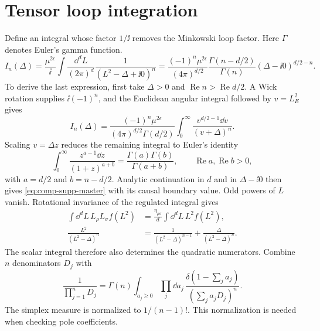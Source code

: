 \section{Tensor loop integration}
Define an integral whose factor $1/\ii$ removes the Minkowski loop
factor. Here $\Gamma$ denotes Euler's gamma function.
\begin{equation}
 I_n(\Delta)=\frac{\mu^{2\epsilon}}{\ii}
 \int\frac{\dd^dL}{(2\pi)^d}\frac1{(L^2-\Delta+\ii0)^n}
 =\frac{(-1)^n\mu^{2\epsilon}}{(4\pi)^{d/2}}
 \frac{\Gamma(n-d/2)}{\Gamma(n)}(\Delta-\ii0)^{d/2-n}.
 \label{eq:comp-supp-master}
\end{equation}
To derive the last expression, first take $\Delta>0$ and
$\operatorname{Re}n>\operatorname{Re}d/2$. A Wick rotation supplies
$\ii(-1)^n$, and the Euclidean angular integral followed by
$v=L_E^2$ gives
\begin{equation}
 I_n(\Delta)=\frac{(-1)^n\mu^{2\epsilon}}
 {(4\pi)^{d/2}\Gamma(d/2)}
 \int_0^\infty\frac{v^{d/2-1}\dd v}{(v+\Delta)^n}.
\end{equation}
Scaling $v=\Delta z$ reduces the remaining integral to Euler's identity
\begin{equation}
 \int_0^\infty\frac{z^{a-1}\dd z}{(1+z)^{a+b}}
 =\frac{\Gamma(a)\Gamma(b)}{\Gamma(a+b)},
 \qquad \operatorname{Re}a,\operatorname{Re}b>0,
\end{equation}
with $a=d/2$ and $b=n-d/2$. Analytic continuation in $d$ and in
$\Delta-\ii0$ then gives \eqref{eq:comp-supp-master} with its causal
boundary value. Odd powers of $L$ vanish. Rotational invariance of the
regulated integral gives
\begin{align}
 \int\dd^dL\,L_\rho L_\sigma f(L^2)
 &=\frac{\eta_{\rho\sigma}}d\int\dd^dL\,L^2f(L^2),\\
 \frac{L^2}{(L^2-\Delta)^n}
 &=\frac1{(L^2-\Delta)^{n-1}}
                  +\frac{\Delta}{(L^2-\Delta)^n}.
\end{align}
The scalar integral therefore also determines the quadratic
numerators. Combine $n$ denominators $D_j$ with
\begin{equation}
 \frac1{\prod_{j=1}^nD_j}
 =\Gamma(n)\int_{a_j\geq0}\prod_j\dd a_j\,
 \frac{\delta(1-\sum_j a_j)}{(\sum_j a_jD_j)^n}.
 \label{eq:comp-supp-feynman-parameters}
\end{equation}
The simplex measure is normalized to $1/(n-1)!$.
This normalization is needed when checking pole coefficients.

